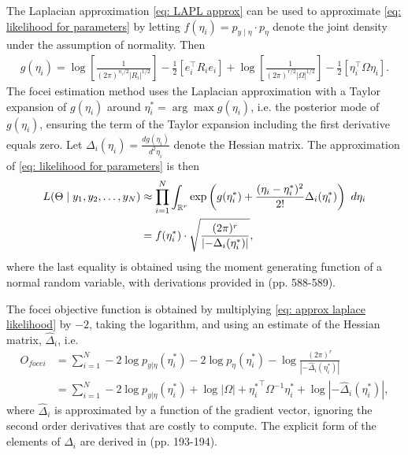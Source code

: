The Laplacian approximation \eqref{eq: LAPL approx} can be used to approximate \eqref{eq: likelihood for parameters} by letting $f(\eta_i)=p_{y\mid  \eta}\cdot p_\eta$ denote the joint density under the assumption of normality. Then
\begin{align*}
    g(\eta_i)=\log\left[\frac{1}{(2\pi)^{n_i/2}|R_i|^{1/2}}\right]-\frac{1}{2}\left[e_i^\top R_i e_i\right] + \log \left[\frac{1}{(2\pi)^{r/2}|\Omega|^{1/2}}\right] -\frac{1}{2}\left[\eta_i^\top \Omega \eta_i\right].
\end{align*}
The focei estimation method uses the Laplacian approximation with a Taylor expansion of $g(\eta_i)$ around $\eta_i^\ast = \arg \max g(\eta_i)$, i.e. the posterior mode of $g(\eta_i)$, ensuring the term of the Taylor expansion including the first derivative equals zero. Let $\Delta_i(\eta_i)=\frac{d g(\eta_i)}{d^2 \eta_i}$ denote the Hessian matrix.
The approximation of \eqref{eq: likelihood for parameters} is then
\begin{align}
    L(\Theta\mid  y_1,y_2,\dots,y_N)&\approx \prod_{i=1}^N\int_{\mathbb{R}^r} \text{exp}\left({ g(\eta_i^\ast) +\frac{(\eta_i-\eta_i^\ast)^2}{2!} \Delta_i(\eta_i^\ast)}\right) \ d\eta_i \nonumber \\
    &= f(\eta_i^\ast) \cdot \sqrt{\frac{(2\pi)^r}{\left|-\Delta_i(\eta_i^\ast)\right|}},\label{eq: approx laplace likelihood}
\end{align}
where the last equality is obtained using the moment generating function of a normal random variable, with derivations provided in \cite{Wang2007} (pp. 588-589). 

The focei objective function is obtained by multiplying \eqref{eq: approx laplace likelihood} by $-2$, taking the logarithm, and using an estimate of the Hessian matrix, $\hat\Delta_i$, i.e.
\begin{align}
    O_{focei}&=\sum_{i=1}^N -2\log p_{y|\eta}(\eta_i^\ast)-2\log p_\eta(\eta_i^\ast)-\log \frac{(2\pi)^r}{\left|-\hat\Delta_i(\eta_i^\ast)\right|} \nonumber \\
    &= \sum_{i=1}^N-2\log p_{y|\eta}(\eta_i^\ast) +\log|\Omega|+{\eta_i^\ast}^\top \Omega^{-1} \eta_i^\ast +\log \left|-\hat\Delta_i(\eta_i^\ast)\right|, \label{eq: focei objective function}
\end{align}
where $\hat\Delta_i$ is approximated 
by a function of the gradient vector, ignoring the second order derivatives that are costly to compute. The explicit form of the elements of $\hat\Delta_i$ are derived in \cite{Almquist2015} (pp. 193-194). 

